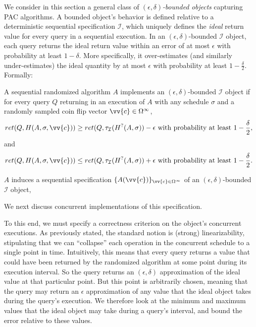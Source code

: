 We consider in this section a general class of
\emph{$(\epsilon, \delta)$-bounded objects} capturing PAC algorithms. A bounded object's
behavior is defined relative to a deterministic
sequential specification $\mathcal{I}$, which uniquely defines
the \emph{ideal} return value for every query in a sequential
execution. In an $(\epsilon, \delta)$-bounded $\mathcal{I}$ object,
each query returns the ideal return value within
an error of at most $\epsilon$ with probability at least $1-\delta$.
More specifically, it over-estimates (and similarly under-estimates) the
ideal quantity by at most $\epsilon$ with probability at least $1-\frac{\delta}{2}$. 
Formally:
\begin{definition}
    A sequential randomized algorithm $A$ implements an $(\epsilon,\delta)$-bounded $\mathcal{I}$
    object if for every query $Q$ returning in
    an execution of $A$ with any schedule $\sigma$ and a randomly sampled
    coin flip vector $\vv{c} \in \Omega^\infty$,
    \[ ret(Q,H(A,\sigma,\vv{c})) \geq ret(Q, \tau_{\mathcal{I}}(H^?(A,\sigma)) - \epsilon \text{ with probability at least } 1-\frac{\delta}{2},\]
    and 
    \[ ret(Q,H(A,\sigma,\vv{c})) \leq ret(Q, \tau_{\mathcal{I}}(H^?(A,\sigma)) + \epsilon \text{ with probability at least } 1-\frac{\delta}{2}.\]
    \label{ivl-def:seq-e,d-obj}

    $A$ induces a sequential specification $\{A(\vv{c})\}_{\vv{c} \in \Omega^\infty}$ of an $(\epsilon,\delta)$-bounded $\mathcal{I}$ object,
\end{definition}


We next discuss concurrent implementations of this specification.


To this end, we must specify a correctness criterion on the object's
concurrent executions. As previously stated, the standard notion
is (strong) linearizability, stipulating that we can ``collapse'' each operation in the concurrent
schedule to a single point in time. Intuitively, this means that every query returns a value
that could have been returned by the randomized algorithm at some point during its execution 
interval. So the query returns an $(\epsilon, \delta)$ approximation of the ideal value at that particular point.
But this point is arbitrarily chosen, meaning that the query may return an $\epsilon$ approximation
of any value that the ideal object takes during the query's execution. We therefore look at the minimum and
maximum values that the ideal object may take during a query's interval, and bound the error relative to these values. 


